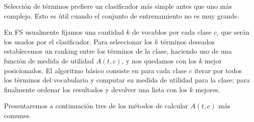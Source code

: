 \documentclass{llncs}
\begin{document}
		Selecci\'on de t\'erminos prefiere un clasificador m\'as simple antes que uno m\'as complejo. Esto es \'util cuando el conjunto de entrenamiento no es muy grande.
		

		 En FS usualmente fijamos una cantidad $k$ de vocablos por cada clase $c$, que ser\'an los usados por el clasificador. Para seleccionar los $k$ t\'erminos deseados establecemos un ranking entre los t\'erminos de la clase, haciendo uso de una funci\'on de medida de utilidad $A(t,c)$, y nos quedamos con los $k$ mejor posicionados. El algoritmo b\'asico consiste en para cada clase $c$ iterar por todos los t\'erminos del vocabulario y computar su medida de utilidad para la clase; para finalmente ordenar los resultados y devolver una lista con los $k$ mejores.
		 
		 Presentaremos a continuaci\'on tres de los m\'etodos de calcular $A(t,c)$ m\'as comunes.
		
\end{document}

